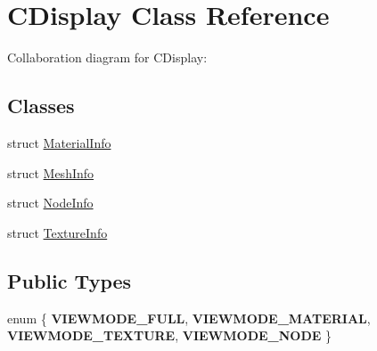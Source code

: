 \hypertarget{class_c_display}{\section{C\+Display Class Reference}
\label{class_c_display}
}


Collaboration diagram for C\+Display\+:
\subsection*{Classes}
\begin{DoxyCompactItemize}
\item 
struct \hyperlink{struct_c_display_1_1_material_info}{Material\+Info}
\item 
struct \hyperlink{struct_c_display_1_1_mesh_info}{Mesh\+Info}
\item 
struct \hyperlink{struct_c_display_1_1_node_info}{Node\+Info}
\item 
struct \hyperlink{struct_c_display_1_1_texture_info}{Texture\+Info}
\end{DoxyCompactItemize}
\subsection*{Public Types}
\begin{DoxyCompactItemize}
\item 
\hypertarget{class_c_display_a4338faa6e3798ad44643a5c1b812220f}{enum \{ {\bfseries V\+I\+E\+W\+M\+O\+D\+E\+\_\+\+F\+U\+L\+L}, 
{\bfseries V\+I\+E\+W\+M\+O\+D\+E\+\_\+\+M\+A\+T\+E\+R\+I\+A\+L}, 
{\bfseries V\+I\+E\+W\+M\+O\+D\+E\+\_\+\+T\+E\+X\+T\+U\+R\+E}, 
{\bfseries V\+I\+E\+W\+M\+O\+D\+E\+\_\+\+N\+O\+D\+E}
 \}}\label{class_c_display_a4338faa6e3798ad44643a5c1b812220f}

\end{DoxyCompactItemize}
